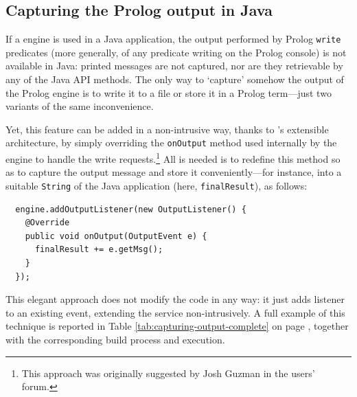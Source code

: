 \subsection{Capturing the Prolog output in Java}
\label{ssec:capturing-output}

If a \tuprolog{} engine is used in a Java application, the output performed by Prolog \texttt{write} predicates (more generally, of any predicate writing on the Prolog console) is not available in Java: printed messages are not captured, nor are they retrievable by any of the \tuprolog{} Java API methods.
%
The only way to `capture' somehow the output of the Prolog engine is to write it to a file or store it in a Prolog term---just two variants of the same inconvenience.

Yet, this feature can be added in a non-intrusive way, thanks to \tuprolog{}'s extensible architecture, by simply overriding the \texttt{onOutput} method used internally by the engine to handle the write requests.\footnote{This approach was originally suggested by Josh Guzman in the \tuprolog{} users' forum.}
All is needed is to redefine this method so as to capture the output message and store it conveniently---for instance, into a suitable \texttt{String} of the Java application (here, \texttt{finalResult}), as follows:

\begin{verbatim}
  engine.addOutputListener(new OutputListener() {
    @Override
    public void onOutput(OutputEvent e) {
      finalResult += e.getMsg();
    }
  });
\end{verbatim}

\noindent This elegant approach does not modify the \tuprolog{} code in any way: it just adds listener to an existing event, extending the service non-intrusively.
%
A full example of this technique is reported in Table
\ref{tab:capturing-output-complete} on page \pageref{tab:capturing-output-complete}, together with the corresponding build process and execution.

